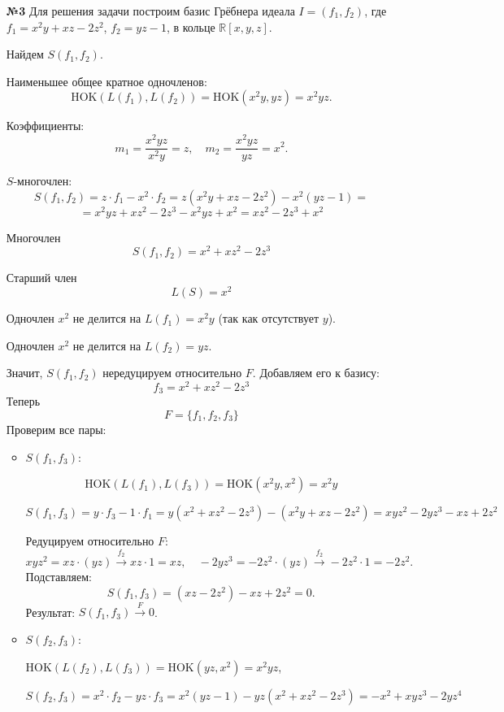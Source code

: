 \documentclass[a4paper]{article}
\begin{document}
\begin{enumerate}
  \item[\textbf{№3}]
  Для решения задачи построим базис Грёбнера идеала \( I = (f_1, f_2) \), где  
  \( f_1 = x^2y + xz - 2z^2 \),  
  \( f_2 = yz - 1 \),  
  в кольце \( \mathbb{R}[x,y,z] \).  

  Найдем \( S(f_1, f_2) \).  

  Наименьшее общее кратное одночленов:  
  \[
  \text{HOK}(L(f_1), L(f_2)) = \text{HOK}(x^2y, yz) = x^2yz.
  \]

  Коэффициенты:  
  \[
  m_1 = \frac{x^2yz}{x^2y} = z, \quad m_2 = \frac{x^2yz}{yz} = x^2.
  \]

  \( S \)-многочлен:  
  \[
  S(f_1, f_2) = z \cdot f_1 - x^2 \cdot f_2 = z(x^2y + xz - 2z^2) - x^2(yz - 1) =\]\[ 
  =x^2yz + xz^2 - 2z^3 - x^2yz + x^2 = xz^2 - 2z^3 + x^2
  \]

  Многочлен \[ S(f_1, f_2) = x^2 + xz^2 - 2z^3 \]  
  
  Старший член \[ L(S) = x^2 \]
  
  Одночлен \( x^2 \) не делится на \( L(f_1) = x^2y \) (так как отсутствует \( y \)).  

  Одночлен \( x^2 \) не делится на \( L(f_2) = yz \).  
  
  Значит, \( S(f_1, f_2) \) нередуцируем относительно \( F \). Добавляем его к базису:  
  \[
  f_3 = x^2 + xz^2 - 2z^3
  \]
  Теперь \[ F = \{f_1, f_2, f_3\} \]
  Проверим все пары:  

  \begin{itemize}
    \item \( S(f_1, f_3) \):  
   
    \[ \text{HOK}(L(f_1), L(f_3)) = \text{HOK}(x^2y, x^2) = x^2y \] 
   
    \( S(f_1, f_3) = y \cdot f_3 - 1 \cdot f_1 = y(x^2 + xz^2 - 2z^3) - 
    (x^2y + xz - 2z^2) = xyz^2 - 2yz^3 - xz + 2z^2 \) 
   
    Редуцируем относительно \( F \):  
     \[
     xyz^2 = xz \cdot (yz) \xrightarrow{f_2} xz \cdot 1 = xz, \quad -2yz^3 = -2z^2
     \cdot (yz) \xrightarrow{f_2} -2z^2 \cdot 1 = -2z^2.
     \]  
     Подставляем:  
     \[
     S(f_1, f_3) = (xz - 2z^2) - xz + 2z^2 = 0.
     \]  
   Результат: \( S(f_1, f_3) \xrightarrow{F} 0 \).

   \item \( S(f_2, f_3) \):  
   
   \( \text{HOK}(L(f_2), L(f_3)) = \text{HOK}(yz, x^2) = x^2yz \),  
   
   \( S(f_2, f_3) = x^2 \cdot f_2 - yz \cdot f_3 = x^2(yz - 1) - yz(x^2 + xz^2 - 2z^3)
    = -x^2 + xyz^3 - 2yz^4\)  
   

\end{itemize}
\end{enumerate}
\end{document}
